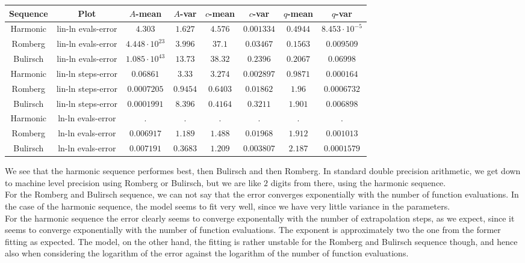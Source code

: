 \begin{table}[H]
    \centering
    \small
    \begin{tabular}{c|c||c|c|c|c|c	|c}
Sequence & Plot & \(A\)-mean & \(A\)-var & \(c\)-mean & \(c\)-var & \(q\)-mean & \(q\)-var\\\hline
Harmonic & lin-ln evals-error & \(4.303\) & \(1.627\) & \(4.576\) & \(0.001334\) & \(0.4944\) & \(8.453\cdot 10^{-5}\) \\
Romberg & lin-ln evals-error & \(4.448\cdot 10^{23}\) & \(3.996\) & \(37.1\) & \(0.03467\) & \(0.1563\) & \(0.009509\) \\
Bulirsch & lin-ln evals-error & \(1.085\cdot 10^{43}\) & \(13.73\) & \(38.32\) & \(0.2396\) & \(0.2067\) & \(0.06998\) \\
Harmonic & lin-ln steps-error & \(0.06861\) & \(3.33\) & \(3.274\) & \(0.002897\) & \(0.9871\) & \(0.000164\) \\
Romberg & lin-ln steps-error & \(0.0007205\) & \(0.9454\) & \(0.6403\) & \(0.01862\) & \(1.96\) & \(0.0006732\) \\
Bulirsch & lin-ln steps-error & \(0.0001991\) & \(8.396\) & \(0.4164\) & \(0.3211\) & \(1.901\) & \(0.006898\) \\
Harmonic & ln-ln evals-error & . & . & . & . & . & . \\
Romberg & ln-ln evals-error & \(0.006917\) & \(1.189\) & \(1.488\) & \(0.01968\) & \(1.912\) & \(0.001013\) \\
Bulirsch & ln-ln evals-error & \(0.007191\) & \(0.3683\) & \(1.209\) & \(0.003807\) & \(2.187\) & \(0.0001579\) \\
    \end{tabular}
    \label{tab:my_label}
\end{table}

We see that the harmonic sequence performes best, then Bulirsch and then Romberg. In standard double precision arithmetic, we get down to machine level precision using Romberg or Bulirsch, but we are like \(2\) digits from there, using the harmonic sequence.\\

For the Romberg and Bulirsch sequence, we can not say that the error converges exponentially with the number of function evaluations. In the case of the harmonic sequence, the model seems to fit very well, since we have very little variance in the parameters.\\

For the harmonic sequence the error clearly seems to converge exponentally with the number of extrapolation steps, as we expect, since it seems to converge exponentially with the number of function evaluations. The exponent is approximately two the one from the former fitting as expected. The model, on the other hand, the fitting is rather unstable for the Romberg and Bulirsch sequence though, and hence also when considering the logarithm of the error against the logarithm of the number of function evaluations.

